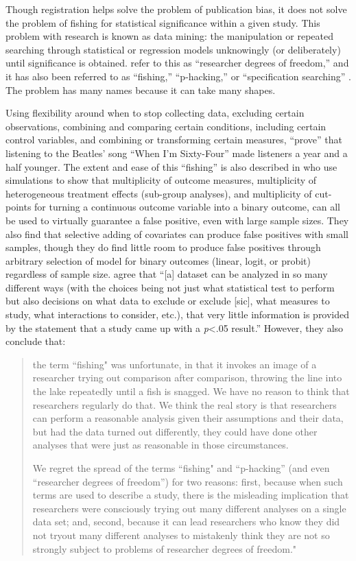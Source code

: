 \documentclass[12pt] {article}
\begin{document}
Though registration helps solve the problem of publication bias, it does
not solve the problem of fishing for statistical significance within a
given study. This problem with research is known as data mining: the manipulation or repeated searching through statistical or regression
models unknowingly (or deliberately) until significance is obtained.
 \cite{simmons_false-positive_2011} refer to this as
``researcher degrees of freedom,'' and it has also been referred to as
``fishing,'' ``p-hacking,'' or ``specification searching'' \citep{humphreys_fishing_2013}. The problem has many names because it can take many shapes. 

Using flexibility around when to stop
collecting data, excluding certain observations, combining and comparing
certain conditions, including certain control variables, and combining
or transforming certain measures, \cite{simmons_false-positive_2011} ``prove'' that listening to the
Beatles' song ``When I'm Sixty-Four'' made listeners a year and a half
younger. The extent and ease of this ``fishing'' is also described in
\cite{humphreys_fishing_2013} who use simulations to show that multiplicity of outcome measures, multiplicity of heterogeneous treatment effects (sub-group analyses), and multiplicity of cut-points for turning a continuous outcome variable into a binary outcome, can all be used to virtually guarantee a false positive, even with large sample sizes. They also find that selective adding of covariates can produce false positives with small samples, though they do find little room to produce false positives through arbitrary selection of model for binary outcomes (linear, logit, or probit) regardless of sample size. \cite{gelman_garden_2013} agree that
``{[}a{]} dataset can be analyzed in so many different ways (with the
choices being not just what statistical test to perform but also
decisions on what data to exclude or exclude {[}sic{]}, what measures to
study, what interactions to consider, etc.), that very little
information is provided by the statement that a study came up with a
\emph{p}\textless{}.05 result.'' However, they also conclude that:

\begin{quote}
the term ``fishing" was unfortunate, in that it invokes an image of a
researcher trying out comparison after comparison, throwing the line
into the lake repeatedly until a fish is snagged. We have no reason to
think that researchers regularly do that. We think the real story is
that researchers can perform a reasonable analysis given their
assumptions and their data, but had the data turned out differently,
they could have done other analyses that were just as reasonable in
those circumstances.

We regret the spread of the terms ``fishing" and ``p-hacking'' (and even
``researcher degrees of freedom'') for two reasons: first, because when
such terms are used to describe a study, there is the misleading
implication that researchers were consciously trying out many different
analyses on a single data set; and, second, because it can lead
researchers who know they did not tryout many different analyses to
mistakenly think they are not so strongly subject to problems of
researcher degrees of freedom."
\end{quote}
\end{document}
